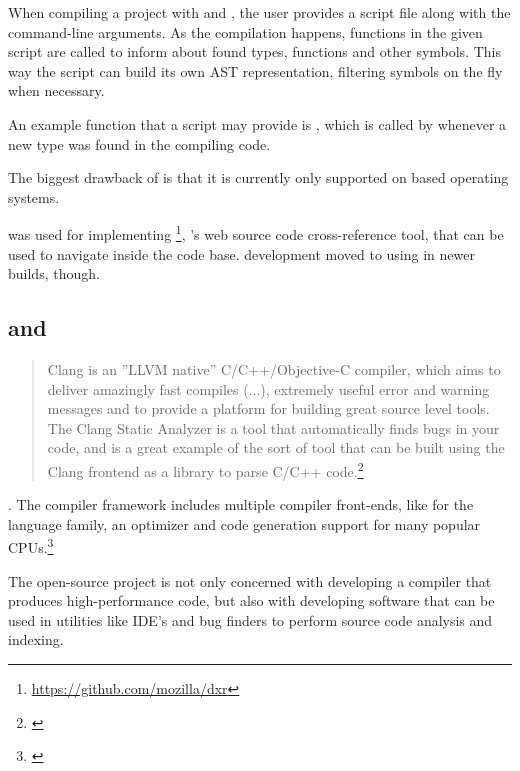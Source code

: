 When compiling a project with  and , the user provides a script file along with the command-line arguments. As the compilation happens, functions in the given script are called to inform about found types, functions and other symbols. This way the script can build its own AST representation, filtering symbols on the fly when necessary.

An example function that a script may provide is , which is called by  whenever a new type was found in the compiling code.

The biggest drawback of  is that it is currently only supported on  based operating systems.

 was used for implementing \footnote{\url{https://github.com/mozilla/dxr}}, 's web source code cross-reference tool, that can be used to navigate inside the  code base.  development moved to using  in newer builds, though.

\subsection{ and }
\label{sec:Clang}

\begin{quotation}
Clang is an ''LLVM native'' C/C++/Objective-C compiler, which aims to deliver amazingly fast compiles (...), extremely useful error and warning messages and to provide a platform for building great source level tools. The Clang Static Analyzer is a tool that automatically finds bugs in your code, and is a great example of the sort of tool that can be built using the Clang frontend as a library to parse C/C++ code.\footnote{\citep{LLVMHP}}
\end{quotation}

. The  compiler framework includes multiple compiler front-ends, like  for the  language family, an optimizer and code generation support for many popular CPUs.\footnote{\citep{LLVMHP}}

The open-source  project is not only concerned with developing a compiler that produces high-performance code, but also with developing software that can be used in utilities like IDE's and bug finders to perform source code analysis and indexing.

